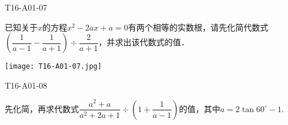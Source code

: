 \begin{defproblem}{T16-A01-07}%
\begin{onlyproblem}%
已知关于$x$的方程$x^2-2ax+a=0$有两个相等的实数根，请先化简代数式$\left(\dfrac{1}{a-1}-\dfrac{1}{a+1}\right)\div \dfrac{2}{a+1}$，并求出该代数式的值．

\end{onlyproblem}%
\begin{onlysolution}%
\texttt{[image: T16-A01-07.jpg]}
\end{onlysolution}%
\end{defproblem}


\begin{defproblem}{T16-A01-08}%
\begin{onlyproblem}%
先化简，再求代数式$\dfrac{a^2+a}{a^2+2a+1}\div \left(1+\dfrac{1}{a-1}\right)$的值，其中$a=2\tan60^{\circ}-1$.

\end{onlyproblem}%
\begin{onlysolution}%

\end{onlysolution}%
\end{defproblem}

